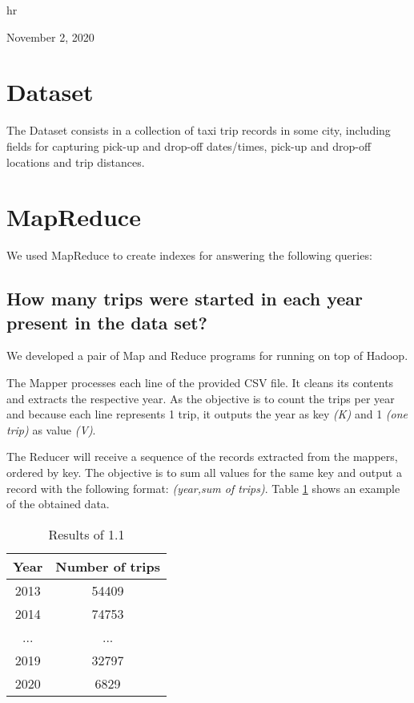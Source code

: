 \documentclass[conference,compsoc]{IEEEtran}
\begin{document}
\hfill hr

\hfill November 2, 2020




\section{Dataset}
The Dataset consists in a collection of taxi trip records in some city, including fields for capturing pick-up and drop-off dates/times, pick-up and drop-off locations and trip distances.

\section{MapReduce}
We used MapReduce to create indexes for answering the following queries:
\subsection{How many trips were started in each year present in the data set?}
We developed a pair of Map and Reduce programs for running on top of Hadoop. \par The Mapper processes each line of the provided CSV file. It cleans its contents and extracts the respective year. As the objective is to count the trips per year and because each line represents 1 trip, it outputs the year as key \textit{(K)} and 1 \textit{(one trip)} as value \textit{(V)}. \par The Reducer will receive a sequence of the records extracted from the mappers, ordered by key. The objective is to sum all values for the same key and output a record with the following format: \textit{(year,sum of trips)}. Table \ref{output_1_1} shows an example of the obtained data.
\begin{table}[!t]
\renewcommand{\arraystretch}{1.3}
\caption{Results of 1.1}
\label{output_1_1}
\centering
\begin{tabular}{c||c}
\hline
\bfseries Year & \bfseries Number of trips\\
\hline\hline
2013 & 54409\\
2014 & 74753\\
... & ...\\
2019 & 32797\\
2020 & 6829 \\
\hline
\end{tabular}
\end{table}
\end{document}
